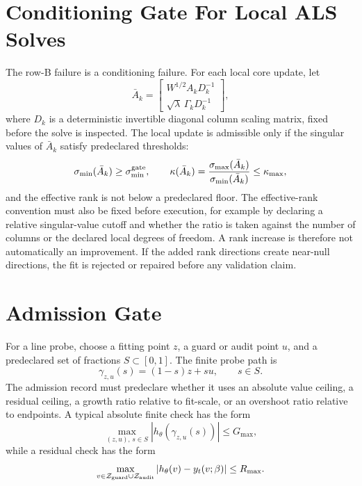 \documentclass[11pt]{article}
\newcommand{\calZ}{\mathcal Z}
\begin{document}
\section{Conditioning Gate For Local ALS Solves}

The row-B failure is a conditioning failure.  For each local core update, let
\[
    \bar A_k
    =
    \begin{bmatrix}
      W^{1/2} A_k D_k^{-1}\\
      \sqrt{\lambda}\,\Gamma_k D_k^{-1}
    \end{bmatrix},
    \label{eq:p72-scaled-augmented-design}
\]
where \(D_k\) is a deterministic invertible diagonal column scaling matrix,
fixed before the solve is inspected.  The local update is admissible only if
the singular values of \(\bar A_k\) satisfy predeclared thresholds:
\begin{equation}
    \sigma_{\min}(\bar A_k)\ge \sigma_{\min}^{\rm gate},
    \qquad
    \kappa(\bar A_k)
    =
    \frac{\sigma_{\max}(\bar A_k)}{\sigma_{\min}(\bar A_k)}
    \le \kappa_{\max},
    \label{eq:p72-conditioning-gate}
\end{equation}
and the effective rank is not below a predeclared floor.  The effective-rank
convention must also be fixed before execution, for example by declaring a
relative singular-value cutoff and whether the ratio is taken against the
number of columns or the declared local degrees of freedom.  A rank increase is
therefore not automatically an improvement.  If the added rank directions
create near-null directions, the fit is rejected or repaired before any
validation claim.

\section{Admission Gate}

For a line probe, choose a fitting point \(z\), a guard or audit point \(u\),
and a predeclared set of fractions \(S\subset[0,1]\).  The finite probe path is
\[
    \gamma_{z,u}(s)=(1-s)z+su,\qquad s\in S.
\]
The admission record must predeclare whether it uses an absolute value ceiling,
a residual ceiling, a growth ratio relative to fit-scale, or an overshoot ratio
relative to endpoints.  A typical absolute finite check has the form
\[
    \max_{(z,u),\,s\in S}|h_\theta(\gamma_{z,u}(s))|\le G_{\max},
\]
while a residual check has the form
\[
    \max_{v\in\calZ_{\rm guard}\cup\calZ_{\rm audit}}
    |h_\theta(v)-y_t(v;\beta)|\le R_{\max}.
\]
\end{document}
